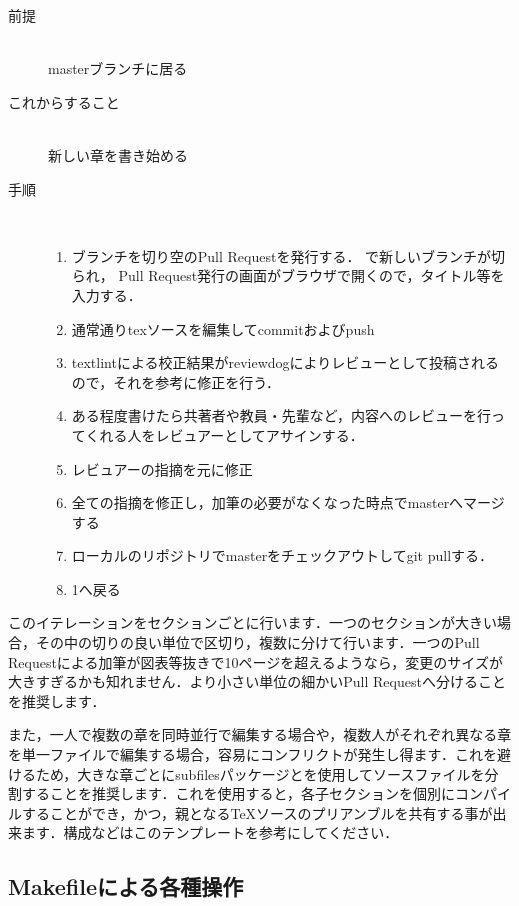 \documentclass[../main]{subfiles}
\begin{document}
\begin{description}
    \item[前提]　\\
        masterブランチに居る
    \item[これからすること]　\\
        新しい章を書き始める
    \item[手順]　\\
        \begin{enumerate}
            \item ブランチを切り空のPull Requestを発行する．
                で新しいブランチが切られ，
                Pull Request発行の画面がブラウザで開くので，タイトル等を入力する．
            \item 通常通りtexソースを編集してcommitおよびpush
            \item textlintによる校正結果がreviewdogによりレビューとして投稿されるので，それを参考に修正を行う．
            \item ある程度書けたら共著者や教員・先輩など，内容へのレビューを行ってくれる人をレビュアーとしてアサインする．
            \item レビュアーの指摘を元に修正
            \item 全ての指摘を修正し，加筆の必要がなくなった時点でmasterへマージする
            \item ローカルのリポジトリでmasterをチェックアウトしてgit pullする．
            \item 1へ戻る
        \end{enumerate}
\end{description}

このイテレーションをセクションごとに行います．一つのセクションが大きい場合，その中の切りの良い単位で区切り，複数に分けて行います．一つのPull Requestによる加筆が図表等抜きで10ページを超えるようなら，変更のサイズが大きすぎるかも知れません．より小さい単位の細かいPull Requestへ分けることを推奨します．


また，一人で複数の章を同時並行で編集する場合や，複数人がそれぞれ異なる章を単一ファイルで編集する場合，容易にコンフリクトが発生し得ます．これを避けるため，大きな章ごとにsubfilesパッケージとを使用してソースファイルを分割することを推奨します．これを使用すると，各子セクションを個別にコンパイルすることができ，かつ，親となるTeXソースのプリアンブルを共有する事が出来ます．構成などはこのテンプレートを参考にしてください．

\subsection{Makefileによる各種操作}
\end{document}
